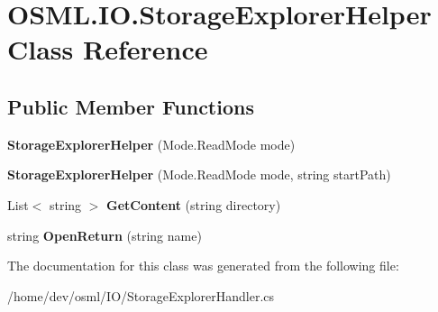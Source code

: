 \hypertarget{classOSML_1_1IO_1_1StorageExplorerHelper}{}\section{O\+S\+M\+L.\+I\+O.\+Storage\+Explorer\+Helper Class Reference}
\label{classOSML_1_1IO_1_1StorageExplorerHelper}
\subsection*{Public Member Functions}
\begin{DoxyCompactItemize}
\item 
\mbox{\label{classOSML_1_1IO_1_1StorageExplorerHelper_a7124e592237ac30af845fad23fa087c2}} 
{\bfseries Storage\+Explorer\+Helper} (Mode.\+Read\+Mode mode)
\item 
\mbox{\label{classOSML_1_1IO_1_1StorageExplorerHelper_afc5423ae6b4ff4cc5dacd0551e93f717}} 
{\bfseries Storage\+Explorer\+Helper} (Mode.\+Read\+Mode mode, string start\+Path)
\item 
\mbox{\label{classOSML_1_1IO_1_1StorageExplorerHelper_a8c7ab2e7a2cf929b41dbdbc1232c569e}} 
List$<$ string $>$ {\bfseries Get\+Content} (string directory)
\item 
\mbox{\label{classOSML_1_1IO_1_1StorageExplorerHelper_ab006db6767feb8ce3a1792c7e3678106}} 
string {\bfseries Open\+Return} (string name)
\end{DoxyCompactItemize}


The documentation for this class was generated from the following file\+:\begin{DoxyCompactItemize}
\item 
/home/dev/osml/\+I\+O/Storage\+Explorer\+Handler.\+cs\end{DoxyCompactItemize}

